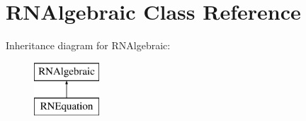 \hypertarget{class_r_n_algebraic}{}\section{R\+N\+Algebraic Class Reference}
\label{class_r_n_algebraic}
Inheritance diagram for R\+N\+Algebraic\+:\begin{figure}[H]
\begin{center}
\leavevmode
\includegraphics[height=2.000000cm]{class_r_n_algebraic}
\end{center}
\end{figure}
